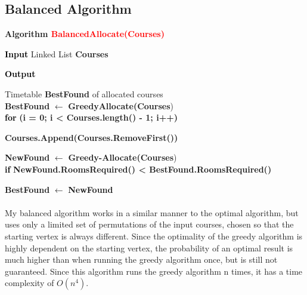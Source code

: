 \documentclass[]{article}
\begin{document}
\subsection{Balanced Algorithm}
\textbf{Algorithm \textcolor{red}{BalancedAllocate(Courses)}}\\
\color{gray}

\hspace*{1cm} \textcolor{black}{\textbf{Input}} Linked List \textbf{Courses}  

\hspace*{1cm} \textcolor{black}{\textbf{Output}} {Timetable \textbf{BestFound} of allocated courses\\

\hspace*{1cm} \textbf{BestFound} \textcolor{black}{$\leftarrow$} \textbf{GreedyAllocate(Courses})\\

\hspace*{1cm} \textcolor{black}{\textbf{for}} \textbf{(i = 0; i \textless{} Courses.length() - 1; i++)}

\hspace*{2cm} \textbf{Courses.Append(Courses.RemoveFirst())}

\hspace*{2cm} \textbf{NewFound} \textcolor{black}{$\leftarrow$} \textbf{Greedy-Allocate(Courses})\\

\hspace*{2cm} \textcolor{black}{\textbf{if}} \textbf{NewFound.RoomsRequired() \textless{} BestFound.RoomsRequired()}

\hspace*{3cm} \textbf{BestFound} \textcolor{black}{$\leftarrow$} \textbf{NewFound}\\
\\
\color{black}
My balanced algorithm works in a similar manner to the optimal algorithm, but uses only a limited set of permutations of the input courses, chosen so that the starting vertex is always different. Since the optimality of the greedy algorithm is highly dependent on the starting vertex, the probability of an optimal result is much higher than when running the greedy algorithm once, but is still not guaranteed. Since this algorithm runs the greedy algorithm n times, it has a time complexity of $O(n^4)$.

\newpage
}
\end{document}
